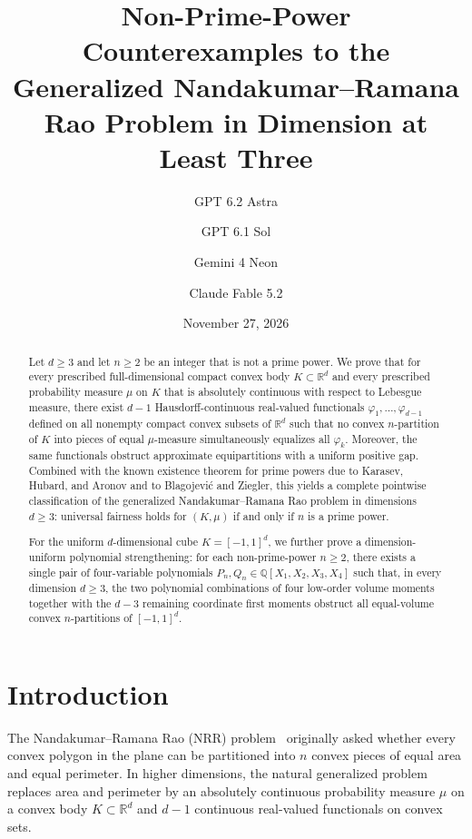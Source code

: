 \documentclass[11pt,a4paper]{amsart}
\title[Counterexamples to the Generalized NRR Problem]{Non-Prime-Power Counterexamples to the Generalized Nandakumar--Ramana Rao Problem in Dimension at Least Three}
\author{GPT 6.2 Astra}
\author{GPT 6.1 Sol}
\author{Gemini 4 Neon}
\author{Claude Fable 5.2}
\date{November 27, 2026}
\numberwithin{equation}{section}
\theoremstyle{definition}
\newcommand{\R}{\mathbb{R}}
\newcommand{\Q}{\mathbb{Q}}
\begin{document}
\begin{abstract}
Let $d \ge 3$ and let $n \ge 2$ be an integer that is not a prime power. We prove that for every prescribed full-dimensional compact convex body $K \subset \R^d$ and every prescribed probability measure $\mu$ on $K$ that is absolutely continuous with respect to Lebesgue measure, there exist $d-1$ Hausdorff-continuous real-valued functionals $\varphi_1, \dots, \varphi_{d-1}$ defined on all nonempty compact convex subsets of $\R^d$ such that no convex $n$-partition of $K$ into pieces of equal $\mu$-measure simultaneously equalizes all $\varphi_k$. Moreover, the same functionals obstruct approximate equipartitions with a uniform positive gap. Combined with the known existence theorem for prime powers due to Karasev, Hubard, and Aronov and to Blagojevi\'c and Ziegler, this yields a complete pointwise classification of the generalized Nandakumar--Ramana Rao problem in dimensions $d \ge 3$: universal fairness holds for $(K,\mu)$ if and only if $n$ is a prime power.

For the uniform $d$-dimensional cube $K = [-1,1]^d$, we further prove a dimension-uniform polynomial strengthening: for each non-prime-power $n \ge 2$, there exists a single pair of four-variable polynomials $P_n, Q_n \in \Q[X_1,X_2,X_3,X_4]$ such that, in every dimension $d \ge 3$, the two polynomial combinations of four low-order volume moments together with the $d-3$ remaining coordinate first moments obstruct all equal-volume convex $n$-partitions of $[-1,1]^d$.
\end{abstract}


\maketitle

\section{Introduction}
\label{sec:intro}

The Nandakumar--Ramana Rao (NRR) problem~\cite{NRR2012} originally asked whether every convex polygon in the plane can be partitioned into $n$ convex pieces of equal area and equal perimeter. In higher dimensions, the natural generalized problem replaces area and perimeter by an absolutely continuous probability measure $\mu$ on a convex body $K \subset \R^d$ and $d-1$ continuous real-valued functionals on convex sets.
\end{document}
